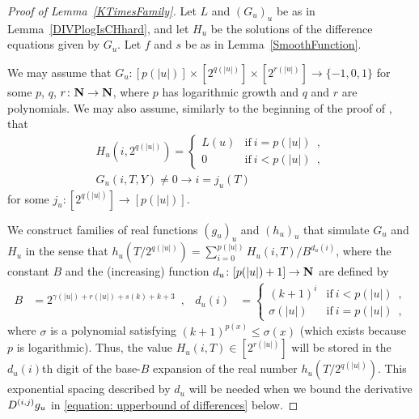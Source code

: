 \begin{proof}[Proof of Lemma~\ref{KTimesFamily}]
Let $L$ and $(G_u)_u$ be as in Lemma~\ref{DIVPlogIsCHhard},
and let $H_u$ be the solutions of 
the difference equations given by $G_u$.
Let $f$ and $s$ be as in Lemma~\ref{SmoothFunction}.

We may assume that 
$G_u \colon [p(|u|)] \times [2^{q(|u|)}] \times [2^{r(|u|)}] \to \{-1, 0, 1\}$
for some $p$, $q$, $r \colon \mathbf N \to \mathbf N$, 
where $p$ has logarithmic growth and $q$ and $r$ are polynomials. 
We may also assume, similarly to the beginning of the proof of \cite[Lemma 4.1]{kawamura2010lipschitz},
that 
\begin{gather}
 H_u(i, 2^{q(|u|)}) = \begin{cases}
		       L(u) & \text{if} \ i=p(|u|) \enspace , \\
		       0 & \text{if} \ i<p(|u|) \enspace , 
		      \end{cases}
\\
 G_u(i, T, Y) \neq 0 \to i = j_u(T) \enspace 
\end{gather}
for some $
j _u \colon [2 ^{q (\lvert u \rvert)}] \to [p (\lvert u \rvert)]
$. 

We construct families of real functions $(g_u)_u$ and $(h_u)_u$ 
that simulate $G _u$ and $H _u$ 
in the sense that $h_u(T/2^{q(|u|)}) = \sum^{p(|u|)}_{i = 0}H_u(i, T)/B^{d_u(i)}$, 
where the constant $B$ and the 
(increasing) function $d_u \colon [p(|u|)+1] \to \mathbf N$ are 
defined by
  \begin{align}
   \label{eq:positioning}
   B &= 2^{\gamma(|u|) + r(|u|) + s(k) + k + 3} \enspace , 
   &
   d_u(i) &= 
   \begin{cases}
    (k+1)^i & \text{if} \ i<p(|u|) \enspace , 
    \\
    \sigma(|u|) & \text{if} \ i=p(|u|) \enspace , 
   \end{cases}
  \end{align}
where $\sigma$ is a polynomial satisfying $(k+1)^{p(x)} \le \sigma(x)$
(which exists because $p$ is logarithmic). 
Thus, the value $H _u (i, T) \in [2 ^{r (\lvert u \rvert)}]$ will be stored 
in the $d _u (i)$th digit of the base-$B$ expansion of 
the real number $h _u (T / 2 ^{q (\lvert u \rvert)})$. 
This exponential spacing described by $d _u$ will be needed
when we bound the derivative $D ^{(i, j)} g _u$ 
in \eqref{equation: upperbound of differences} below. 


\end{proof}
